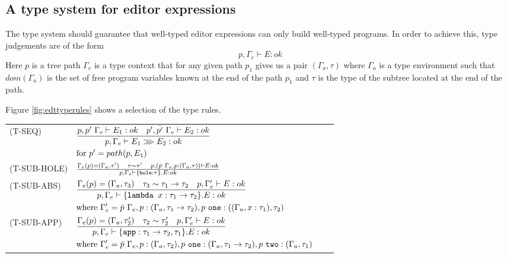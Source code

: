 \subsection{A type system for editor expressions}

The type system should guarantee that well-typed editor expressions
can only build well-typed programs. In order to achieve this, type
judgements are of the form
%
\[ p,\Gamma_e \vdash E : ok \]
%
Here $p$ is a tree path $\Gamma_e$ is a type context that for any
given path $p_1$ gives us a pair $(\Gamma_a,\tau)$
where $\Gamma_a$ is a type environment such that $dom(\Gamma_a)$ is
the set of free program variables known at the end of the path $p_1$
and $\tau$ is the type of the subtree located at the end of the path.

Figure \ref{fig:edttyperules} shows a selection of the type rules.

\begin{figure*}
  \center
  \renewcommand{\arraystretch}{2}
  \begin{tabular}{llll}
    \scriptsize(T-SEQ)       & \scriptsize$\TSeq$ & &\\
    \scriptsize(T-SUB-HOLE)  & $\TSubHole$ & &           \\
    \scriptsize(T-SUB-ABS)   & \scriptsize$\TSubAbs$   & & \\
    \scriptsize(T-SUB-APP)   & \scriptsize$ \TSubApp$ & & \\
  \end{tabular}
  \caption{Selected type rules for editor expressions}
  \label{fig:edttyperules}
\end{figure*}

